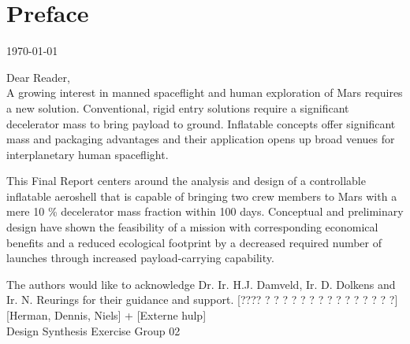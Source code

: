\section*{Preface}\label{cha:preface}

\begin{flushright}
	\today
\end{flushright}

Dear Reader,	
\\ [1cm]
A growing interest in manned spaceflight and human exploration of Mars requires a new solution. Conventional, rigid entry solutions require a significant decelerator mass to bring payload to ground. Inflatable concepts offer significant mass and packaging advantages and their application opens up broad venues for interplanetary human spaceflight. 

This Final Report centers around the analysis and design of a controllable inflatable aeroshell that is capable of bringing two crew members to Mars with a mere 10 \% decelerator mass fraction within 100 days. Conceptual and preliminary design have shown the feasibility of a mission with corresponding economical benefits and a reduced ecological footprint by a decreased required number of launches through increased payload-carrying capability.

The authors would like to acknowledge Dr. Ir. H.J. Damveld, Ir. D. Dolkens and Ir. N. Reurings for their guidance and support. [???? ? ? ? ? ? ? ? ? ? ? ? ? ? ? ?] [Herman, Dennis, Niels] + [Externe hulp]
\\ [1.5cm]
Design Synthesis Exercise Group 02
